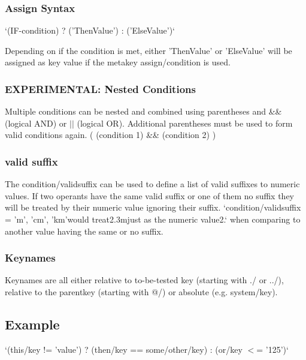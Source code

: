 \subsubsection*{Assign Syntax}

`(I\+F-\/condition) ? ('Then\+Value') \+: ('Else\+Value')`

Depending on if the condition is met, either 'Then\+Value' or 'Else\+Value' will be assigned as key value if the metakey {\ttfamily assign/condition} is used.

\subsubsection*{E\+X\+P\+E\+R\+I\+M\+E\+N\+T\+A\+L\+: Nested Conditions}

Multiple conditions can be nested and combined using parentheses and {\ttfamily \&\&} (logical A\+N\+D) or {\ttfamily $\vert$$\vert$} (logical O\+R). Additional parentheses must be used to form valid conditions again. {\ttfamily (} {\ttfamily (condition 1) \&\& (condition 2)} {\ttfamily )}

\subsubsection*{valid suffix}

The {\ttfamily condition/validsuffix} can be used to define a list of valid suffixes to numeric values. If two operants have the same valid suffix or one of them no suffix they will be treated by their numeric value ignoring their suffix. `condition/validsuffix = 'm', 'cm', 'km'{\ttfamily would treat}2.\+3m{\ttfamily just as the numeric value}2.` when comparing to another value having the same or no suffix.

\subsubsection*{Keynames}

Keynames are all either relative to to-\/be-\/tested key (starting with {\ttfamily ./} or {\ttfamily ../}), relative to the parentkey (starting with {\ttfamily @/}) or absolute (e.\+g. {\ttfamily system/key}).

\subsection*{Example}

`(this/key != 'value') ? (then/key == some/other/key) \+: (or/key $<$= '125')`

